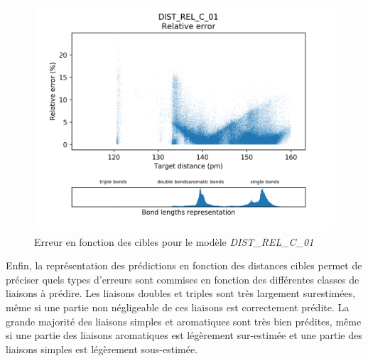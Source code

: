 \begin{figure}[!h]
	\centering
	
	\includegraphics[scale=0.7]{../figures/DIST_REL_C_01/DIST_REL_C_01_distrib_rmse_dist.png}	
	
	\caption{Erreur en fonction des cibles pour le modèle \emph{DIST\_REL\_C\_01}}
\end{figure}

\par Enfin, la représentation des prédictions en fonction des distances cibles permet de préciser quels types d'erreurs sont commises en fonction des différentes classes de liaisons à prédire. Les liaisons doubles et triples sont très largement surestimées, même si une partie non négligeable de ces liaisons est correctement prédite. La grande majorité des liaisons simples et aromatiques sont très bien prédites, même si une partie des liaisons aromatiques est légèrement sur-estimée et une partie des liaisons simples est légèrement sous-estimée.\\


